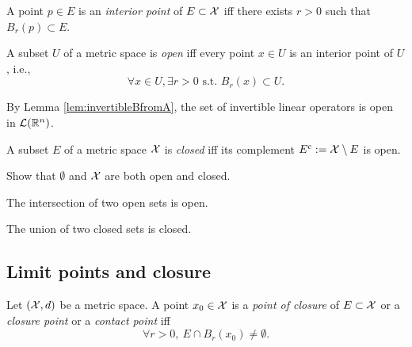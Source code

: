 \begin{defn}
  \label{def:interiorPoint}
  A point $p\in E$ is an \emph{interior point} of $E\subset {\cal X}$
  iff there exists $r>0$ such that $B_r(p)\subset E$.
\end{defn}

\begin{defn}
  \label{def:openSetInMetricSpace}
  A subset $U$ of a metric space is \emph{open} iff
  every point $x\in U$ is an interior point of $U$, i.e., 
  \begin{displaymath}
    \forall x\in U, \exists r>0 \text{ s.t. }
    B_r(x)\subset U.
  \end{displaymath}
\end{defn}

\begin{exm}
  \label{exm:invertibleOpSetIsOpen}
  By Lemma \ref{lem:invertibleBfromA},
  the set of invertible linear operators is open
  in ${\cal L}(\mathbb{R}^n)$.
\end{exm}

\begin{defn}
  \label{def:closedSets}
  A subset $E$ of a metric space ${\cal X}$ is \emph{closed}
  iff its complement $E^c:={\cal X}\setminus E$ is open.
\end{defn}

\begin{exc}
  Show that $\emptyset$ and ${\cal X}$
  are both open and closed.
\end{exc}

\begin{lem}
  \label{lem:intersectionOpenSets}
  The intersection of two open sets is open.
\end{lem}

\begin{lem}
  \label{lem:unionClosedSets}
  The union of two closed sets is closed.
\end{lem}


\subsection{Limit points and closure}
\label{sec:limit-points-conv}

\begin{defn}
  \label{def:closurePointInMetricSpace}
  Let $({\cal X},d)$ be a metric space.
  A point $x_0\in {\cal X}$ is %
  a \emph{point of closure} of $E\subset {\cal X}$
  or a \emph{closure point} or a \emph{contact point}
  iff
  \begin{equation}
    \label{eq:closurePoint}
    \forall r>0, \ E\cap B_r(x_0) \ne \emptyset.
  \end{equation}
\end{defn}

